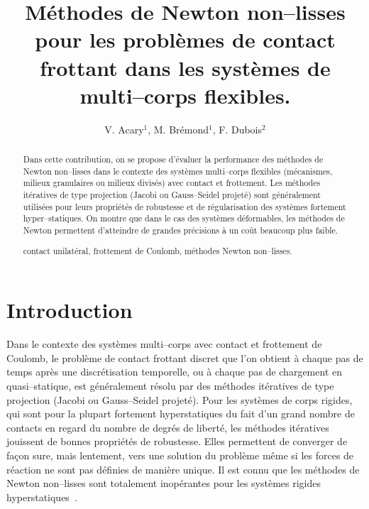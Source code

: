 \documentclass{CSMA2017}
\title{Méthodes de Newton non--lisses pour les problèmes de contact frottant dans les systèmes de multi--corps flexibles.}
\author{V. Acary$^1$, M. Brémond$^1$, F. Dubois$^2$}
\newcommand\red[1]{\textcolor{red}{#1}}
\begin{document}
\maketitle

\begin{abstract}
Dans cette contribution, on se propose d'évaluer la performance des méthodes de Newton non--lisses dans le contexte des systèmes multi--corps flexibles (mécanismes, milieux granulaires ou milieux divisés) avec contact et frottement. Les méthodes itératives de type projection (Jacobi ou Gauss--Seidel projeté) sont généralement utilisées pour leurs propriétés de robustesse et de régularisation des systèmes fortement hyper--statiques. On montre que dans le cas des systèmes déformables, les méthodes de Newton permettent d'atteindre de grandes précisions à un coût beaucoup plus faible.

\keywords contact unilatéral, frottement de Coulomb, méthodes Newton non--lisses.
\end{abstract}

\section{Introduction}

Dans le contexte des systèmes multi--corps avec contact et frottement de Coulomb, le problème de contact frottant discret que l'on obtient à chaque pas de temps après une discrétisation temporelle, ou à chaque pas de chargement en quasi--statique, est généralement résolu par des méthodes itératives de type projection (Jacobi ou Gauss--Seidel projeté). 
%
Pour les systèmes de corps rigides, qui sont pour la plupart fortement hyperstatiques du fait d'un grand nombre de contacts en regard du nombre de degrés de liberté, les méthodes itératives jouissent de bonnes propriétés de robustesse. Elles permettent de converger de façon sure, mais lentement, vers une solution du problème même si les forces de réaction ne sont pas définies de manière unique. Il est connu que les méthodes de Newton non--lisses sont totalement inopérantes pour les systèmes rigides hyperstatiques~\cite{bertailsdescoubes:inria-00557706}. \marginpar{\red{Une autre citation?}}
\end{document}
